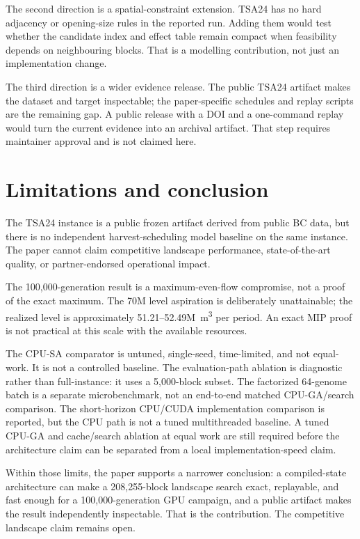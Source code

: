 \documentclass[preprint,11pt]{elsarticle}
\begin{document}
The second direction is a spatial-constraint extension. TSA24 has no hard adjacency or opening-size
rules in the reported run. Adding them would test whether the candidate index and effect table remain
compact when feasibility depends on neighbouring blocks. That is a modelling contribution, not just
an implementation change.

The third direction is a wider evidence release. The public TSA24 artifact makes the dataset and
target inspectable; the paper-specific schedules and replay scripts are the remaining gap. A public
release with a DOI and a one-command replay would turn the current evidence into an archival artifact.
That step requires maintainer approval and is not claimed here.

\section{Limitations and conclusion}\label{limitations-and-conclusion}

The TSA24 instance is a public frozen artifact derived from public BC data, but
there is no independent harvest-scheduling model baseline on the same instance.
The paper cannot claim competitive landscape performance, state-of-the-art
quality, or partner-endorsed operational impact.

The 100,000-generation result is a maximum-even-flow compromise, not a proof of
the exact maximum. The 70M level aspiration is deliberately unattainable; the
realized level is approximately 51.21--52.49M~m\textsuperscript{3} per period. An
exact MIP proof is not practical at this scale with the available resources.

The CPU-SA comparator is untuned, single-seed, time-limited, and not equal-work.
It is not a controlled baseline. The evaluation-path ablation is diagnostic rather than full-instance:
it uses a 5,000-block subset. The factorized 64-genome batch is a separate microbenchmark, not an
end-to-end matched CPU-GA/search comparison. The short-horizon CPU/CUDA implementation comparison is
reported, but the CPU path is not a tuned multithreaded baseline. A tuned CPU-GA and cache/search
ablation at equal work are still required before the architecture claim can be separated from a
local implementation-speed claim.

Within those limits, the paper supports a narrower conclusion: a compiled-state
architecture can make a 208,255-block landscape search exact, replayable, and
fast enough for a 100,000-generation GPU campaign, and a public artifact makes
the result independently inspectable. That is the contribution. The competitive
landscape claim remains open.
\end{document}
